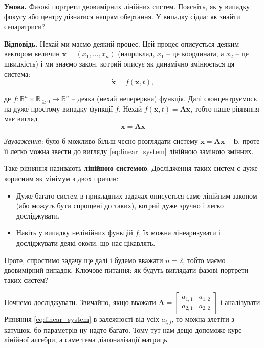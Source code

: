 \documentclass[oneside,solution]{tmpl}
\begin{document}
\hspace{20px}\textbf{Умова.} Фазові портрети двовимірних лінійних систем. Поясніть, як у випадку фокусу або центру
дізнатися напрям обертання. У випадку сідла: як знайти сепаратриси?

\textbf{Відповідь.} Нехай ми маємо деякий процес. Цей процес описується деяким вектором величин $\mathbf{x} = (x_1,\dots,x_n)$ (наприклад, $x_1$ -- це координата, а $x_2$ -- це швидкість) і ми знаємо закон, котрий описує як динамічно змінюється ця система:
\begin{equation}
    \dot{\mathbf{x}} = f(\mathbf{x}, t),
\end{equation}

де $f: \mathbb{R}^n \times \mathbb{R}_{\geq 0} \to \mathbb{R}^n$ -- деяка (нехай неперервна) функція. Далі сконцентруємось на дуже простому випадку функції $f$. Нехай $f(\mathbf{x},t) = \boldsymbol{A}\mathbf{x}$, тобто наше рівняння має вигляд
\begin{equation}\label{eq:linear_system}
    \dot{\mathbf{x}} = \boldsymbol{A}\mathbf{x}
\end{equation}

\textit{Зауваження:} було б можливо більш чесно розглядати систему $\dot{\mathbf{x}} = \boldsymbol{A}\mathbf{x} + \mathbf{b}$, проте її легко можна звести до вигляду \ref{eq:linear_system} лінійною заміною змінних.

Таке рівняння називають \textbf{лінійною системою}. Дослідження таких систем є дуже корисним як мінімум з двох причин:
\begin{itemize}
    \item Дуже багато систем в прикладних задачах описується саме лінійним законом (або можуть бути спрощені до таких), котрий дуже зручно і легко досліджувати.
    \item Навіть у випадку нелінійних функцій $f$, їх можна лінеаризувати і досліджувати деякі околи, що нас цікавлять.
\end{itemize}

Проте, спростимо задачу ще далі і будемо вважати $n=2$, тобто маємо двовимірний випадок. Ключове питання: як будуть виглядати фазові портрети таких систем?

Почнемо досліджувати. Звичайно, якщо вважати $\boldsymbol{A} = \begin{bmatrix}
    a_{1,1} & a_{1,2} \\ a_{2,1} & a_{2,2}
\end{bmatrix}$ і аналізувати Рівняння \ref{eq:linear_system} в залежності від усіх $a_{i,j}$, то можна злетіти з катушок, бо параметрів ну надто багато. Тому тут нам дещо допоможе курс лінійної алгебри, а саме тема діагоналізації матриць.
\end{document}
